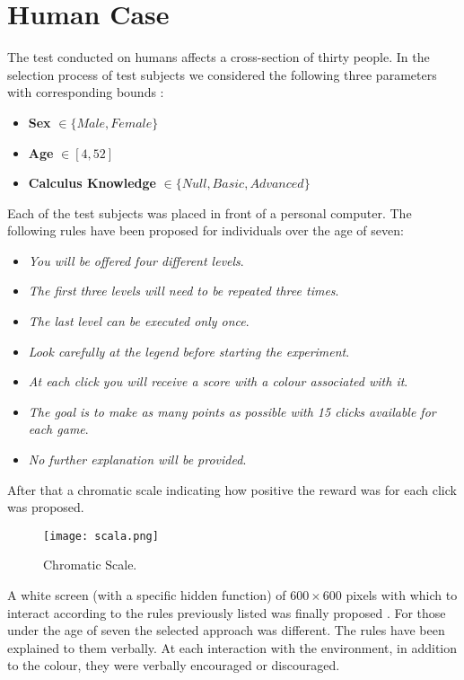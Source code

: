 \section{Human Case}

The test conducted on humans affects a cross-section of thirty people. In the selection process of test subjects we considered the following three parameters with corresponding bounds :

\begin{itemize}
	\item \textbf{Sex} $\in \{Male, Female\}$
	\item \textbf{Age} $\in [4, 52]$
	\item \textbf{Calculus Knowledge} $\in \{Null, Basic, Advanced\}$ 
\end{itemize}  

Each of the test subjects was placed in front of a personal computer. The following rules have been proposed for individuals over the age of seven:

	
\begin{itemize}
	\item \textit{You will be offered four different levels}.
	\item \textit{The first three levels will need to be repeated three times}.
	\item \textit{The last level can be executed only once}.
	\item \textit{Look carefully at the legend before starting the experiment}.
	\item \textit{At each click you will receive a score with a colour associated with it}.
	\item \textit{The goal is to make as many points as possible with 15 clicks available for each game}.
	\item \textit{No further explanation will be provided}.
\end{itemize}


After that a chromatic scale indicating how positive the reward was for each click was proposed.

\begin{figure}[h!]
	\centering
	\texttt{[image: scala.png]}
	\caption{Chromatic Scale.}
	\label{fig:Cromatic Scale}
\end{figure}

A white screen (with a specific hidden function) of $600 \times 600$ pixels with which to interact according to the rules previously listed was finally proposed . For those under the age of seven the selected approach was different. The rules have been explained to them verbally. At each interaction with the environment, in addition to the colour, they were verbally encouraged or discouraged.








